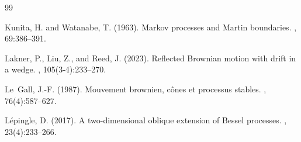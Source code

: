 \documentclass[11pt]{article}
\theoremstyle{definition}
\begin{document}
\begin{thebibliography}{99}




Kunita, H. and Watanabe, T. (1963).
\newblock Markov processes and Martin boundaries.
, 69:386--391.


Lakner, P., Liu, Z., and Reed, J. (2023).
\newblock Reflected Brownian motion with drift in a wedge.
, 105(3-4):233--270.


Le~Gall, J.-F. (1987).
\newblock Mouvement brownien, c\^ones et processus stables.
, 76(4):587--627.

L\'epingle, D. (2017).
\newblock A two-dimensional oblique extension of {B}essel processes.
, 23(4):233--266.


\end{thebibliography}
\end{document}
